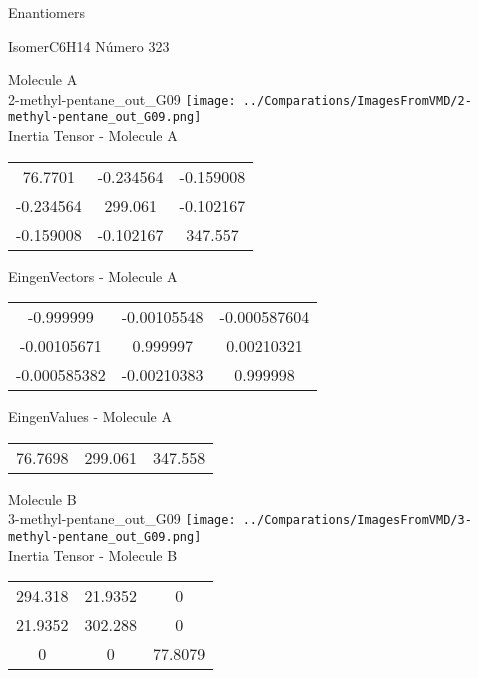 \begin{center}
\vtab
\vtab
\textcolor{NavyBlue}{\Large Enantiomers}
\end{center}

 \newpage

\vtab[-2cm]
\begin{center}
{\large IsomerC6H14 \tab Número 323}
\end{center}
\begin{multicols}{2}
\begin{center}

Molecule A \\ 
2-methyl-pentane\_out\_G09
\texttt{[image: ../Comparations/ImagesFromVMD/2-methyl-pentane\_out\_G09.png]}
\\
Inertia Tensor - Molecule A \\
\vtab

\begin{tabular}{|c c c|}
76.7701	 & 	-0.234564	 & 	-0.159008	 \\
-0.234564	 & 	299.061	 & 	-0.102167	 \\
-0.159008	 & 	-0.102167	 & 	347.557
\end{tabular}

\vtab
 EingenVectors - Molecule A     \\
\vtab
\begin{tabular}{|c c c|}
-0.999999	 & 	-0.00105548	 & 	-0.000587604	 \\
-0.00105671	 & 	0.999997	 & 	0.00210321	 \\
-0.000585382	 & 	-0.00210383	 & 	0.999998
\end{tabular}

\vtab
 EingenValues - Molecule A     \\
\vtab
\begin{tabular}{|c c c|}
76.7698	 & 	299.061	 & 	347.558	 \\
\end{tabular}
\columnbreak

Molecule B \\ 
3-methyl-pentane\_out\_G09
\texttt{[image: ../Comparations/ImagesFromVMD/3-methyl-pentane\_out\_G09.png]}
\\
Inertia Tensor - Molecule B \\
\vtab

\begin{tabular}{|c c c|}
294.318	 & 	21.9352	 & 	0	 \\
21.9352	 & 	302.288	 & 	0	 \\
0	 & 	0	 & 	77.8079
\end{tabular}


\end{center}
\end{multicols}
